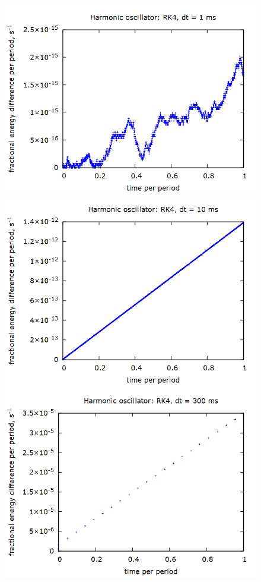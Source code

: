\documentclass[aps,prl,twocolumn,superscriptaddress]{revtex4-1}
\begin{document}
\begin{figure}[htbp]
  	\begin{center}
 		\includegraphics[scale=0.3]{4_1.png}
 		\includegraphics[scale=0.3]{4_10.png}
 		\includegraphics[scale=0.3]{4_300.png}

\end{center}
\end{figure}
\end{document}

